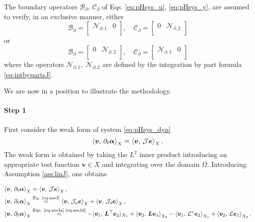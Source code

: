 \begin{assumption}\label{ass:operBC}
	The boundary operators $\mathcal{B}_\partial, \, \mathcal{C}_\partial$ of Eqs. \eqref{eq:pHsys_u}, \eqref{eq:pHsys_y}, are assumed to verify, in an exclusive manner, either
	\begin{equation}\label{eq:assB1C2}
	\mathcal{B}_\partial = \begin{bmatrix}
	\mathcal{N}_{\partial, 1} & 0 \\
	\end{bmatrix}, \quad \mathcal{C}_\partial = \begin{bmatrix}
	0 & \mathcal{N}_{\partial, 2} \\
	\end{bmatrix}
	\end{equation}
	or 
	\begin{equation}\label{eq:assB2C1}
	\mathcal{B}_\partial = \begin{bmatrix}
	0 & \mathcal{N}_{\partial, 2} \\
	\end{bmatrix}, \quad 
	\mathcal{C}_\partial = \begin{bmatrix}
	\mathcal{N}_{\partial, 1} & 0 \\
	\end{bmatrix}
	\end{equation}
	where the operators $\mathcal{N}_{\partial, 1}, \; \mathcal{N}_{\partial, 2}$ are defined by the integration by part formula \eqref{eq:intbypartsJ}. 

\end{assumption}


We are now in a position to illustrate the methodology. 
\paragraph{Step 1} First consider the weak form of system \eqref{eq:pHsys_dyn}
\begin{equation}
\inner[X]{\bm{v}}{\partial_t \bm{\alpha}} = \inner[X]{\bm{v}}{\mathcal{J} \bm{e}}.
\end{equation}
The weak form is obtained by taking the $L^2$ inner product introducing an appropriate test function $\bm{v} \in X$ and integrating over the domain $\Omega$. Introducing Assumption \ref{ass:linJ}, one obtains


\begin{align}
\inner[X]{\bm{v}}{\partial_t \bm{\alpha}} &= \inner[X]{\bm{v}}{\mathcal{J} \bm{e}}, \\
{\inner[X]{\bm{v}}{\partial_t \bm{\alpha}}} &\stackrel{\text{Eq. \eqref{eq:assJ}}}{=} \inner[X]{\bm{v}}{\mathcal{J}_a\bm{e}} + \inner[X]{\bm{v}}{\mathcal{J}_{d}\bm{e}}, \\  
\inner[X]{\bm{v}}{\partial_t \bm{\alpha}} &\stackrel{\text{Eqs. \eqref{eq:assJa} \eqref{eq:assJd}}}{=} -  \langle{\bm{v}_1},\,{\bm{L}^\top \bm{e}_2}\rangle_{X_1} + \inner[X_2]{\bm{v}_2}{\bm{L}\bm{e}_1}-  \inner[X_1]{\bm{v}_1}{\mathcal{L}^*\bm{e}_2} + \inner[X_2]{\bm{v}_2}{\mathcal{L}\bm{e}_1}. \label{eq:weak_dyn}
\end{align}


